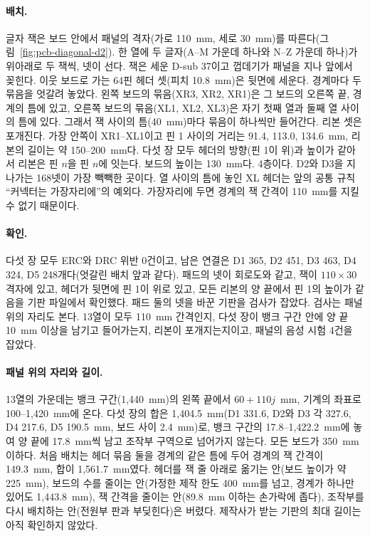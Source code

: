 \paragraph{배치.} 글자 잭은 보드 안에서 패널의 격자(가로 110~mm, 세로 30~mm)를 따른다(그림~\ref{fig:pcb-diagonal-d2}).
한 열에 두 글자(A--M 가운데 하나와 N--Z 가운데 하나)가 위아래로 두 잭씩, 넷이 선다. 잭은 세운 D-sub 37이고 껍데기가
패널을 지나 앞에서 꽂힌다. 이웃 보드로 가는 64핀 헤더 셋(피치 10.8~mm)은 뒷면에 세운다. 경계마다 두 묶음을 엇갈려
놓았다. 왼쪽 보드의 묶음(XR3, XR2, XR1)은 그 보드의 오른쪽 끝, 경계의 틈에 있고, 오른쪽 보드의 묶음(XL1, XL2, XL3)은
자기 첫째 열과 둘째 열 사이의 틈에 있다. 그래서 잭 사이의 틈(40~mm)마다 묶음이 하나씩만 들어간다. 리본 셋은
포개진다. 가장 안쪽이 XR1--XL1이고 핀 1 사이의 거리는 91.4, 113.0, 134.6~mm, 리본의 길이는 약 150--200~mm다. 다섯 장
모두 헤더의 방향(핀 1이 위)과 높이가 같아서 리본은 핀 $n$을 핀 $n$에 잇는다. 보드의 높이는 130~mm다. 4층이다. D2와
D3을 지나가는 168넷이 가장 빽빽한 곳이다. 열 사이의 틈에 놓인 XL 헤더는 앞의 공통 규칙 ``커넥터는 가장자리에''의
예외다. 가장자리에 두면 경계의 잭 간격이 110~mm를 지킬 수 없기 때문이다.

\paragraph{확인.} 다섯 장 모두 ERC와 DRC 위반 0건이고, 남은 연결은 D1 365, D2 451, D3 463, D4 324, D5 248개다(엇갈린
배치 앞과 같다). 패드의 넷이 회로도와 같고, 잭이 $110 \times 30$ 격자에 있고, 헤더가 뒷면에 핀 1이 위로 있고, 모든
리본의 양 끝에서 핀 1의 높이가 같음을 기판 파일에서 확인했다. 패드 둘의 넷을 바꾼 기판을 검사가 잡았다. 검사는 패널
위의 자리도 본다. 13열이 모두 110~mm 간격인지, 다섯 장이 뱅크 구간 안에 양 끝 10~mm 이상을 남기고 들어가는지, 리본이
포개지는지이고, 패널의 음성 시험 4건을 잡았다.

\paragraph{패널 위의 자리와 길이.} 13열의 가운데는 뱅크 구간(1,440~mm)의 왼쪽 끝에서 $60 + 110 j$~mm, 기계의 좌표로
100--1,420~mm에 온다. 다섯 장의 합은 1,404.5~mm(D1 331.6, D2와 D3 각 327.6, D4 217.6, D5 190.5~mm, 보드 사이 2.4~mm)로,
뱅크 구간의 17.8--1,422.2~mm에 놓여 양 끝에 17.8~mm씩 남고 조작부 구역으로 넘어가지 않는다. 모든 보드가 350~mm
이하다. 처음 배치는 헤더 묶음 둘을 경계의 같은 틈에 두어 경계의 잭 간격이 149.3~mm, 합이 1,561.7~mm였다. 헤더를 잭
줄 아래로 옮기는 안(보드 높이가 약 225~mm), 보드의 수를 줄이는 안(가정한 제작 한도 400~mm를 넘고, 경계가 하나만
있어도 1,443.8~mm), 잭 간격을 줄이는 안(89.8~mm 이하는 손가락에 좁다), 조작부를 다시 배치하는 안(전원부 판과 부딪힌다)은
버렸다. 제작사가 받는 기판의 최대 길이는 아직 확인하지 않았다.

